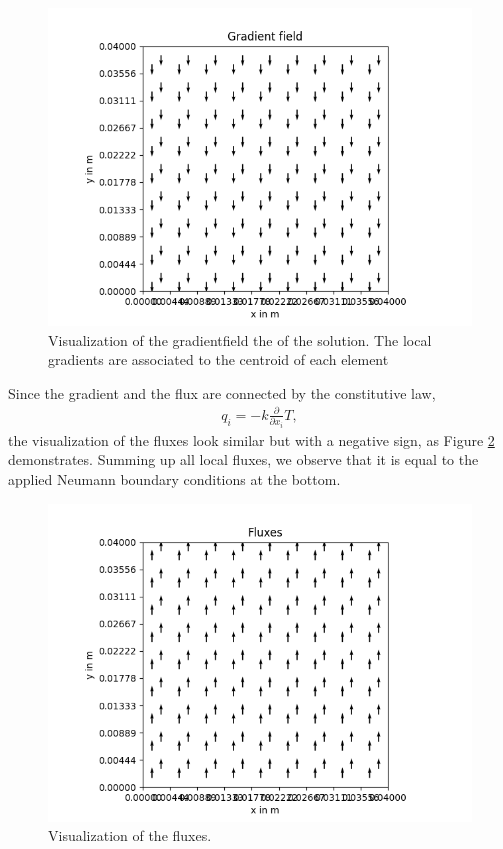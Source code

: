 \documentclass[a4paper,pt]{report}
\begin{document}
\begin{figure}
	\centering
	\includegraphics[scale=0.6]{gradientfield.png}
	\caption{Visualization of the gradientfield the of the solution. The local gradients are associated to the centroid of each element}
	\label{gradientfield}
\end{figure}

Since the gradient and the flux are connected by the constitutive law,
\begin{align*}
q_i=-k\frac{\partial }{\partial x_i}T,
\end{align*}
the visualization of the fluxes look similar but with a negative sign, as Figure \ref{fluxes} demonstrates. Summing up all local fluxes, we observe that it is equal to the applied Neumann boundary conditions at the bottom.

\begin{figure}
	\centering
	\includegraphics[scale=0.6]{fluxes.png}
	\caption{Visualization of the fluxes.}
	\label{fluxes}
\end{figure}
\end{document}

